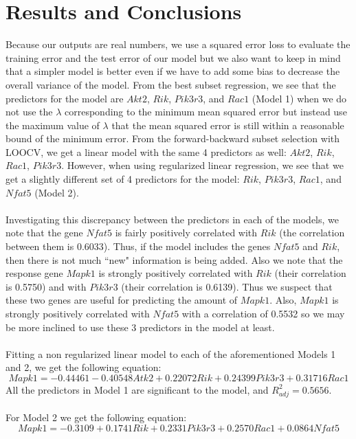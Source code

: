 \documentclass{article}
\begin{document}
\section{Results and Conclusions}
Because our outputs are real numbers, we use a squared error loss to evaluate the training error and the test error of our model but we also want to keep in mind that a simpler model is better even if we have to add some bias to decrease the overall variance of the model.  From the best subset regression, we see that the predictors for the model are $Akt2$, $Rik$, $Pik3r3$, and $Rac1$ (Model 1) when we do not use the $\lambda$ corresponding to the minimum mean squared error but instead use the maximum value of $\lambda$ that the mean squared error is still within a reasonable bound of the minimum error.  From the forward-backward subset selection with LOOCV, we get a linear model with the same 4 predictors as well: $Akt2$, $Rik$, $Rac1$, $Pik3r3$.  However, when using regularized linear regression, we see that we get a slightly different set of 4 predictors for the model: $Rik$, $Pik3r3$, $Rac1$, and $Nfat5$ (Model 2).  \\
\null\\
Investigating this discrepancy between the predictors in each of the models, we note that the gene $Nfat5$ is fairly positively correlated with $Rik$ (the correlation between them is 0.6033).  Thus, if the model includes the genes $Nfat5$ and $Rik$, then there is not much ``new" information is being added.  Also we note that the response gene $Mapk1$ is strongly positively correlated with $Rik$ (their correlation is 0.5750) and with $Pik3r3$ (their correlation is 0.6139).  Thus we suspect that these two genes are useful for predicting the amount of $Mapk1$.  Also, $Mapk1$ is strongly positively correlated with $Nfat5$ with a correlation of  0.5532 so we may be more inclined to use these 3 predictors in the model at least. \\
\null\\
Fitting a non regularized linear model to each of the aforementioned Models 1 and 2, we get the following equation:
\begin{equation}
	Mapk1 = -0.44461-0.40548Atk2+0.22072Rik+0.24399Pik3r3+0.31716Rac1
	\label{eq:Model1}
\end{equation}
All the predictors in Model 1 are significant to the model, and $R^2_{adj}=0.5656$.\\
\null\\
For Model 2 we get the following equation:
\begin{equation}
	Mapk1=-0.3109+0.1741Rik+0.2331Pik3r3+0.2570Rac1+0.0864Nfat5
	\label{eq:Model2}
\end{equation}
\end{document}
